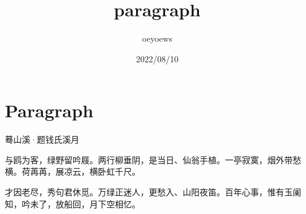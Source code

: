 \documentclass{ctexart}
\title{paragraph}
\author{oeyoews}
\date{2022/08/10}
\begin{document}
\maketitle


\newpage

\section{Paragraph}%
\label{sec:Paragraph}

\centerline{ 蓦山溪·题钱氏溪月 }

与鸥为客，绿野留吟屐。两行柳垂阴，是当日、仙翁手植。一亭寂寞，烟外带愁横。荷苒苒，展凉云，横卧虹千尺。

才因老尽，秀句君休觅。万绿正迷人，更愁入、山阳夜笛。百年心事，惟有玉阑知，吟未了，放船回，月下空相忆。
\end{document}
